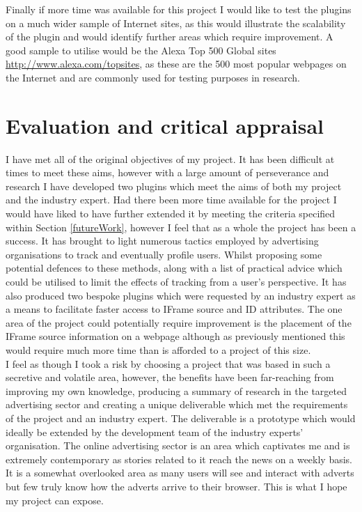 \documentclass[12pt]{article}
\begin{document}
Finally if more time was available for this project I would like to test the plugins on a much wider sample of Internet sites, as this would illustrate the scalability of the plugin and would identify further areas which require improvement. A good sample to utilise would be the Alexa Top 500 Global sites \url{http://www.alexa.com/topsites}, as these are the 500 most popular webpages on the Internet and are commonly used for testing purposes in research.  


\pagebreak

\section{Evaluation and critical appraisal}
I have met all of the original objectives of my project. It has been difficult at times to meet these aims, however with a large amount of perseverance and research I have developed two plugins which meet the aims of both my project and the industry expert. Had there been more time available for the project I would have liked to have further extended it by meeting the criteria specified within Section \ref{futureWork}, however I feel that as a whole the project has been a success. It has brought to light numerous tactics employed by advertising organisations to track and eventually profile users. Whilst proposing some potential defences to these methods, along with a list of practical advice which could be utilised to limit the effects of tracking from a user's perspective. It has also produced two bespoke plugins which were requested by an industry expert as a means to facilitate faster access to IFrame source and ID attributes. The one area of the project could potentially require improvement is the placement of the IFrame source information on a webpage although as previously mentioned this would require much more time than is afforded to a project of this size. \\

I feel as though I took a risk by choosing a project that was based in such a secretive and volatile area, however, the benefits have been far-reaching from improving my own knowledge, producing a summary of research in the targeted advertising sector and creating a unique deliverable which met the requirements of the project and an industry expert. The deliverable is a prototype which would ideally be extended by the development team of the industry experts' organisation. The online advertising sector is an area which captivates me and is extremely contemporary as stories related to it reach the news on a weekly basis. It is a somewhat overlooked area as many users will see and interact with adverts but few truly know how the adverts arrive to their browser. This is what I hope my project can expose. \\
\end{document}
